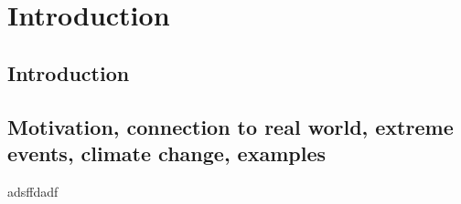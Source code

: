 
\chapter{Introduction}

\section{Introduction}


\section{Motivation, connection to real world, extreme events, climate change, examples}
adsffdadf

